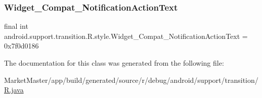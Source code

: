 \subsubsection{\texorpdfstring{Widget\+\_\+\+Compat\+\_\+\+Notification\+Action\+Text}{Widget\_Compat\_NotificationActionText}}
{\footnotesize\ttfamily final int android.\+support.\+transition.\+R.\+style.\+Widget\+\_\+\+Compat\+\_\+\+Notification\+Action\+Text = 0x7f0d0186\hspace{0.3cm}{\ttfamily [static]}}



The documentation for this class was generated from the following file\+:\begin{DoxyCompactItemize}
\item 
Market\+Master/app/build/generated/source/r/debug/android/support/transition/\mbox{\hyperlink{debug_2android_2support_2transition_2R_8java}{R.\+java}}\end{DoxyCompactItemize}
